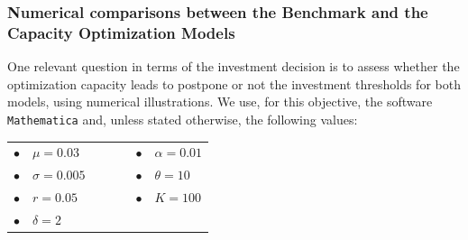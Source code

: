 \subsubsection{Numerical comparisons between the Benchmark and the Capacity Optimization Models}



One relevant question in terms of the investment decision is to assess whether the optimization capacity leads to postpone or not the investment thresholds for both models, using numerical illustrations. We use, for this objective, the software \texttt{Mathematica} and, unless stated otherwise, the following values:

\begin{table}[!htb]
	\centering
	\begin{tabular}{lllllll}
		 $\bullet$ & $\mu=0.03$     &  & \hspace{7cm} &  &  $\bullet$ & $\alpha=0.01$ \\
		 $\bullet$ & $\sigma=0.005$ &  & \hspace{7cm} &  &  $\bullet$ & $\theta=10$   \\
		 $\bullet$ & $r=0.05$       &  & \hspace{7cm} &  &  $\bullet$ & $K=100$       \\
		 $\bullet$ & $\delta=2$                                
	\end{tabular}
\end{table}	


